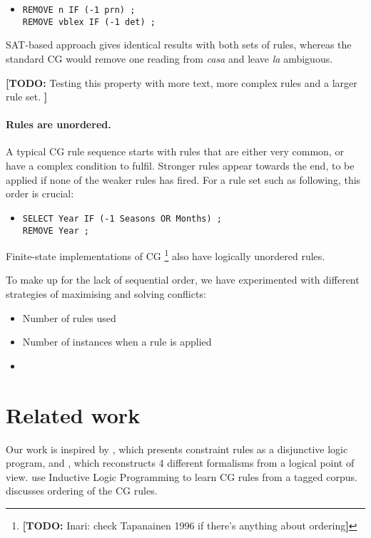 \documentclass[11pt]{article}
\newcommand{\todo}[1]{{\color{cyan}\textbf{[TODO: }#1\textbf{]}}}
\begin{document}
\begin{itemize}
\item [] \texttt{REMOVE n IF (-1 prn) ;} \\
             \texttt{REMOVE vblex IF (-1 det) ;}
\end{itemize}

SAT-based approach gives identical results with both sets of rules,
whereas the standard CG would remove one reading from \emph{casa} and leave \emph{la} ambiguous.

\todo{Testing this property with more text, more complex rules and a larger rule set. }

\paragraph{Rules are unordered.}
A typical CG rule sequence starts with rules that are either very common, or have a complex condition to fulfil.
Stronger rules appear towards the end, to be applied if none of the weaker rules has fired. 
For a rule set such as following, this order is crucial:

\begin{itemize}
\item [] \texttt{SELECT Year IF (-1 Seasons OR Months) ;} \\
             \texttt{REMOVE Year ;}
\end{itemize}

Finite-state implementations of CG \cite{koskenniemi92} \footnote{\todo{Inari: check Tapanainen 1996 if there's anything about ordering}} also have logically unordered rules. 

To make up for the lack of sequential order, we have experimented with different strategies of maximising and solving conflicts:
\begin{itemize}
\item Number of rules used
\item Number of instances when a rule is applied
\item 
\end{itemize}





\section{Related work}
\label{sect:related}

Our work is inspired by \cite{lager98}, which presents constraint rules as a disjunctive logic program,
and \cite{lager_nivre01}, which reconstructs 4 different formalisms from a logical point of view.
\cite{lindberg_eineborg98ilp,asfrent14} use Inductive Logic Programming to learn CG rules from a tagged corpus.
\cite{lager01transformation} discusses ordering of the CG rules.
\end{document}

